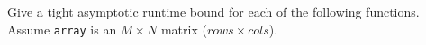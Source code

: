 Give a tight asymptotic runtime bound for each of the following functions.
Assume \lstinline$array$ is an $M \times N$ matrix ($rows \times cols$).
